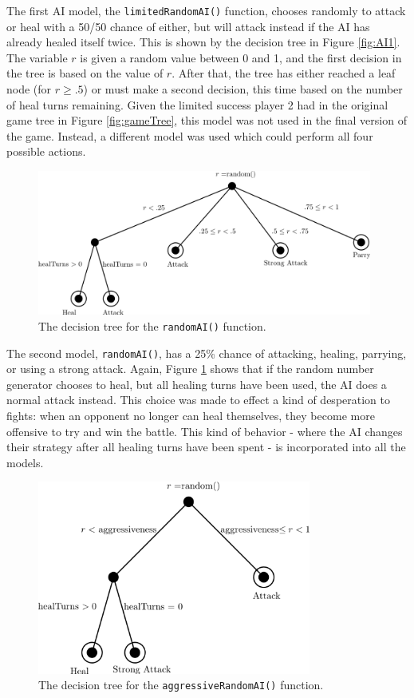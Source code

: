 The first AI model, the \texttt{limitedRandomAI()} function, chooses randomly to attack or heal with a 50/50 chance of either, but will attack instead if the AI has already healed itself twice. This is shown by the decision tree in Figure \ref{fig:AI1}. The variable $r$ is given a random value between 0 and 1, and the first decision in the tree is based on the value of $r$. After that, the tree has either reached a leaf node (for $r\ge .5$) or must make a second decision, this time based on the number of heal turns remaining. Given the limited success player 2 had in the original game tree in Figure \ref{fig:gameTree}, this model was not used in the final version of the game. Instead, a different model was used which could perform all four possible actions.\\

\begin{figure}[H]
  \centering
  \includegraphics[width=11cm]{figures/AIRandom.png}
  \caption{The decision tree for the \texttt{randomAI()} function.}
  \label{fig:AI2}
\end{figure}
The second model, \texttt{randomAI()}, has a 25\% chance of attacking, healing, parrying, or using a strong attack. Again, Figure \ref{fig:AI2} shows that if the random number generator chooses to heal, but all healing turns have been used, the AI does a normal attack instead. This choice was made to effect a kind of desperation to fights: when an opponent no longer can heal themselves, they become more offensive to try and win the battle. This kind of behavior - where the AI changes their strategy after all healing turns have been spent - is incorporated into all the models.\\

\begin{figure}[H]
  \centering
  \includegraphics[width=9cm]{figures/AIAgressive.png}
  \caption{The decision tree for the \texttt{aggressiveRandomAI()} function.}
  \label{fig:AI3}
\end{figure}

